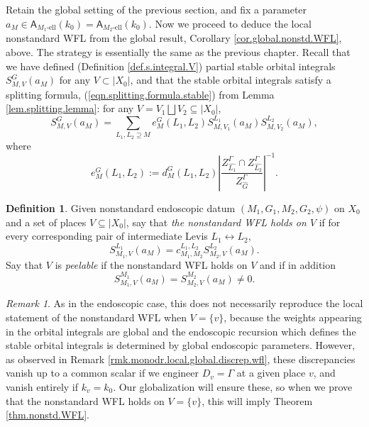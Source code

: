 \documentclass[openany]{amsbook}
\theoremstyle{definition}
\newtheorem{definition}[theorem]{Definition}
\theoremstyle{remark}
\newtheorem{remark}[theorem]{Remark}
\numberwithin{equation}{section}
\renewcommand{\-}{\operatorname{-}}
\newcommand{\el}{\text{-ell}}
\newcommand{\bA}{\mathsf{A}}
\begin{document}
Retain the global setting of the previous section, and fix a parameter $a_M \in \bA_{M_1\el}(k_0) = \bA_{M_2\el}(k_0)$. Now we proceed to deduce the local nonstandard WFL from the global result, Corollary \ref{cor.global.nonstd.WFL}, above. The strategy is essentially the same as the previous chapter. Recall that we have defined (Definition \ref{def.s.integral.V}) partial stable orbital integrals $S_{M,V}^G(a_M)$ for any $V \subset |X_0|$, and that the stable orbital integrals satisfy a splitting formula, (\ref{eqn.splitting.formula.stable}) from Lemma \ref{lem.splitting.lemma}: for any $V = V_1 \bigsqcup V_2 \subseteq |X_0|$,
$$
    S_{M,V}^{G}(a_M) = \sum_{L_1, L_2 \supseteq M} e_M^G(L_1, L_2) S_{M,V_1}^{L_1}(a_M) S_{M,V_2}^{L_2}(a_M),
$$
where
$$e_M^G(L_1,L_2) := d_M^G(L_1, L_2) \left|\frac{Z_{\widehat{L_1}}^\Gamma \cap Z_{\widehat{L_2}}^\Gamma}{Z_{\widehat{G}}^\Gamma} \right|^{-1}.$$

\begin{definition}\label{def.nonstd.WFL.V}
    Given nonstandard endoscopic datum $(M_1, G_1, M_2, G_2, \psi)$ on $X_0$ and a set of places $V \subseteq |X_0|$, say that \emph{the nonstandard WFL holds on $V$} if for every corresponding pair of intermediate Levis $L_1 \longleftrightarrow L_2$,
    $$
        S_{M_1,V}^{L_1}(a_M) = c_{M_1, M_2}^{L_1, L_2} S_{M_2, V}^{L_2}(a_M).
    $$
    Say that $V$ is \emph{peelable} if the nonstandard WFL holds on $V$ and if in addition
    $$
        S_{M_1,V}^{M_1}(a_M) = S_{M_2,V}^{M_2}(a_M) \neq 0.
    $$
\end{definition}

\begin{remark}\label{rmk.nonstd.local.global.discrep}
    As in the endoscopic case, this does not necessarily reproduce the local statement of the nonstandard WFL when $V = \{v\}$, because the weights appearing in the orbital integrals are global and the endoscopic recursion which defines the stable orbital integrals is determined by global endoscopic parameters. However, as observed in Remark \ref{rmk.monodr.local.global.discrep.wfl}, these discrepancies vanish up to a common scalar if we engineer $D_v = \Gamma$ at a given place $v$, and vanish entirely if $k_v = k_0$. Our globalization will ensure these, so when we prove that the nonstandard WFL holds on $V = \{v\}$, this will imply Theorem \ref{thm.nonstd.WFL}.
\end{remark}
\end{document}
